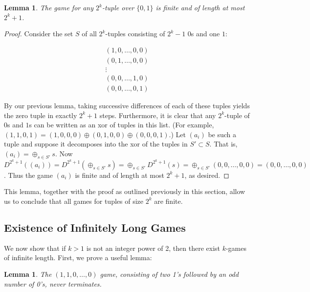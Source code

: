 \documentclass[12pt]{amsart}
\newtheorem{lemma}[theorem]{Lemma}
\newcommand{\xor}{\oplus}
\begin{document}
\begin{lemma}
The game for any $2^k$-tuple over $\{0,1\}$ is finite and of length at most $2^k+1$.
\end{lemma}

\begin{proof}
Consider the set $S$ of all $2^k$-tuples consisting of $2^k-1$ $0$s and one $1$:

$$\begin{array}{c}
(1,0,\ldots,0,0) \\
(0,1,\ldots,0,0) \\
\vdots \\
(0,0,\ldots,1,0) \\
(0,0,\ldots,0,1)
\end{array}$$

By our previous lemma, taking successive differences of each of these tuples yields the zero tuple in exactly $2^k+1$ steps. Furthermore, it is clear that any $2^k$-tuple of $0$s and $1$s can be written as an xor of tuples in this list. (For example, $(1,1,0,1)=(1,0,0,0)\xor(0,1,0,0)\xor(0,0,0,1)$.) Let $(a_i)$ be such a tuple and suppose it decomposes into the xor of the tuples in $S'\subset S$. That is, $(a_i)=\xor_{s\in S'} s$. Now $D^{2^k+1}((a_i))=D^{2^k+1}(\xor_{s\in S'} s)=\xor_{s\in S'} D^{2^k+1}(s)=\xor_{s\in S'} (0,0,\ldots,0,0) = (0,0,\ldots,0,0)$. Thus the game $(a_i)$ is finite and of length at most $2^k+1$, as desired.
\end{proof}

This lemma, together with the proof as outlined previously in this section, allow us to conclude that all games for tuples of size $2^k$ are finite.

\subsection{Existence of Infinitely Long Games}

We now show that if $k > 1$ is not an integer power of 2, then there exist $k$-games of infinite length. First, we prove a useful lemma:

\begin{lemma}
The $(1, 1, 0, \ldots, 0)$ game, consisting of two 1's followed by an odd number of 0's, never terminates.
\label{lem:evenodds}
\end{lemma}
\end{document}
